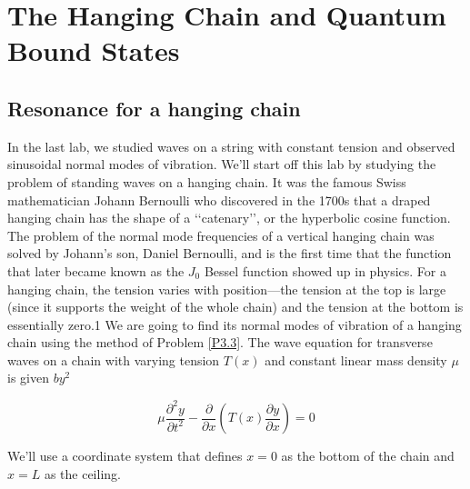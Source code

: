 
\chapter*{The Hanging Chain and Quantum Bound States}
\section*{Resonance for a hanging chain}

In the last lab, we studied waves on a string with constant tension and observed
sinusoidal normal modes of vibration. We\rq ll start off this lab by studying the
problem of standing waves on a hanging chain. It was the famous Swiss mathematician Johann Bernoulli who discovered in the 1700s that a draped hanging
chain has the shape of a \lq\lq catenary\rq\rq, or the hyperbolic cosine function. The problem of the normal mode frequencies of a vertical hanging chain was solved by
Johann\rq s son, Daniel Bernoulli, and is the first time that the function that later
became known as the $J_0$ Bessel function showed up in physics.
For a hanging chain, the tension varies with position—the tension at the top
is large (since it supports the weight of the whole chain) and the tension at the
bottom is essentially zero.1 We are going to find its normal modes of vibration of a
hanging chain using the method of Problem \ref{P3.3}. The wave equation for transverse
waves on a chain with varying tension $T (x)$ and constant linear mass density $\mu$ is
given $by^2$

\begin{equation}\label{eq:41}
		\mu \frac{\partial^2 y}{\partial t^2} - \frac{\partial}{\partial x}(T(x)\frac{\partial y}{\partial x}) = 0
				\end{equation}
				
		We\rq ll use a coordinate system that defines $x = 0$ as the bottom of the chain and
$x = L$ as the ceiling.		


